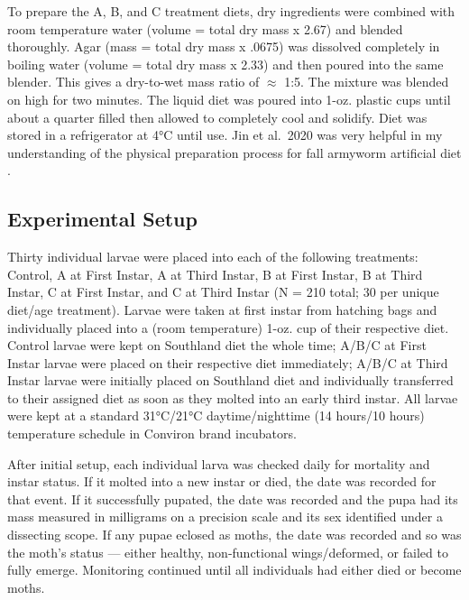 \documentclass[12pt,]{article}
\begin{document}
To prepare the A, B, and C treatment diets, dry ingredients were
combined with room temperature water (volume = total dry mass x 2.67)
and blended thoroughly. Agar (mass = total dry mass x .0675) was
dissolved completely in boiling water (volume = total dry mass x 2.33)
and then poured into the same blender. This gives a dry-to-wet mass
ratio of \(\approx\) 1:5. The mixture was blended on high for two
minutes. The liquid diet was poured into 1-oz. plastic cups until about
a quarter filled then allowed to completely cool and solidify. Diet was
stored in a refrigerator at 4°C until use. Jin et al.~2020 was very
helpful in my understanding of the physical preparation process for fall
armyworm artificial diet \autocite{jin_comparative_2020}.

\hypertarget{experimental-setup}{%
\subsection{\texorpdfstring{\textbf{Experimental
Setup}}{Experimental Setup}}\label{experimental-setup}}

Thirty individual larvae were placed into each of the following
treatments: Control, A at First Instar, A at Third Instar, B at First
Instar, B at Third Instar, C at First Instar, and C at Third Instar (N =
210 total; 30 per unique diet/age treatment). Larvae were taken at first
instar from hatching bags and individually placed into a (room
temperature) 1-oz. cup of their respective diet. Control larvae were
kept on Southland diet the whole time; A/B/C at First Instar larvae were
placed on their respective diet immediately; A/B/C at Third Instar
larvae were initially placed on Southland diet and individually
transferred to their assigned diet as soon as they molted into an early
third instar. All larvae were kept at a standard 31°C/21°C
daytime/nighttime (14 hours/10 hours) temperature schedule in Conviron
brand incubators.

After initial setup, each individual larva was checked daily for
mortality and instar status. If it molted into a new instar or died, the
date was recorded for that event. If it successfully pupated, the date
was recorded and the pupa had its mass measured in milligrams on a
precision scale and its sex identified under a dissecting scope. If any
pupae eclosed as moths, the date was recorded and so was the moth's
status --- either healthy, non-functional wings/deformed, or failed to
fully emerge. Monitoring continued until all individuals had either died
or become moths.
\end{document}
